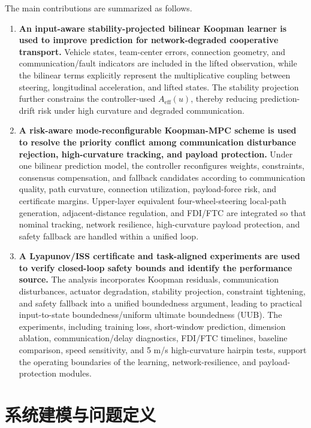 \documentclass[twocolumn,3p,times,procedia]{elsarticle}
\begin{document}
The main contributions are summarized as follows.
\begin{enumerate}
\item \textbf{An input-aware stability-projected bilinear Koopman learner is used to improve prediction for network-degraded cooperative transport.} Vehicle states, team-center errors, connection geometry, and communication/fault indicators are included in the lifted observation, while the bilinear terms explicitly represent the multiplicative coupling between steering, longitudinal acceleration, and lifted states. The stability projection further constrains the controller-used $A_{\mathrm{eff}}(u)$, thereby reducing prediction-drift risk under high curvature and degraded communication.
\item \textbf{A risk-aware mode-reconfigurable Koopman-MPC scheme is used to resolve the priority conflict among communication disturbance rejection, high-curvature tracking, and payload protection.} Under one bilinear prediction model, the controller reconfigures weights, constraints, consensus compensation, and fallback candidates according to communication quality, path curvature, connection utilization, payload-force risk, and certificate margins. Upper-layer equivalent four-wheel-steering local-path generation, adjacent-distance regulation, and FDI/FTC are integrated so that nominal tracking, network resilience, high-curvature payload protection, and safety fallback are handled within a unified loop.
\item \textbf{A Lyapunov/ISS certificate and task-aligned experiments are used to verify closed-loop safety bounds and identify the performance source.} The analysis incorporates Koopman residuals, communication disturbances, actuator degradation, stability projection, constraint tightening, and safety fallback into a unified boundedness argument, leading to practical input-to-state boundedness/uniform ultimate boundedness (UUB). The experiments, including training loss, short-window prediction, dimension ablation, communication/delay diagnostics, FDI/FTC timelines, baseline comparison, speed sensitivity, and 5 m/s high-curvature hairpin tests, support the operating boundaries of the learning, network-resilience, and payload-protection modules.
\end{enumerate}

\section{系统建模与问题定义}
\end{document}

